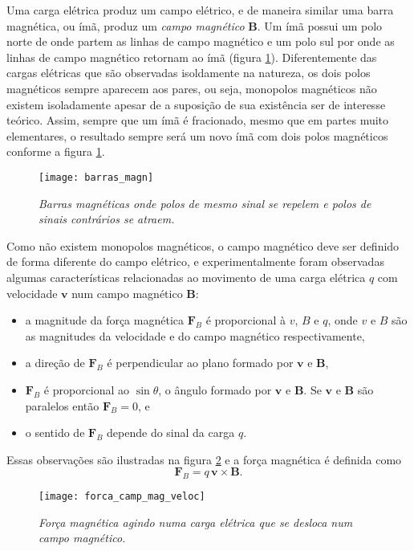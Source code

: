 Uma carga elétrica produz um campo elétrico, e de maneira similar uma barra magnética, ou ímã, produz um \textit{campo magnético} $\textbf{B}$. Um ímã possui um polo norte de onde partem as linhas de campo magnético e um polo sul por onde as linhas de campo magnético retornam ao ímã (figura \ref{fig.barras_mag}). Diferentemente das cargas elétricas que são observadas isoldamente na natureza, os dois polos magnéticos sempre aparecem aos pares, ou seja, monopolos magnéticos não existem isoladamente apesar de a suposição de sua existência ser de interesse teórico. Assim, sempre que um ímã é fracionado, mesmo que em partes muito elementares, o resultado sempre será um novo ímã com dois polos magnéticos conforme a figura \ref{fig.barras_mag}.
\begin{figure}[!htb]
\centering
\texttt{[image: barras\_magn]}
\caption{\textit{Barras magnéticas onde polos de mesmo sinal se repelem e polos de sinais contrários se atraem.}}
\label{fig.barras_mag}
\end{figure}
Como não existem monopolos magnéticos, o campo magnético deve ser definido de forma diferente do campo elétrico, e experimentalmente foram observadas algumas características relacionadas ao movimento de uma carga elétrica $q$ com velocidade $\textbf{v}$ num campo magnético $\textbf{B}$:
\begin{itemize}
\item a magnitude da força magnética $\textbf{F}_B$ é proporcional à $v$, $B$ e $q$, onde $v$ e $B$ são as magnitudes da velocidade e do campo magnético respectivamente,
\item a direção de $\textbf{F}_B$ é perpendicular ao plano formado por $\textbf{v}$ e $\textbf{B}$,
\item $\textbf{F}_B$ é proporcional ao $\sin\theta$, o ângulo formado por $\textbf{v}$ e $\textbf{B}$. Se $\textbf{v}$ e $\textbf{B}$ são paralelos então $\textbf{F}_B=0$, e
\item o sentido de $\textbf{F}_B$ depende do sinal da carga $q$.
\end{itemize}
Essas observações são ilustradas na figura \ref{fig.froca_mag_veloc} e a força magnética é definida como
\begin{equation*}
\textbf{F}_B=q\,\textbf{v}\times\textbf{B}.
\end{equation*}
\begin{figure}[!htb]
\centering
\texttt{[image: forca\_camp\_mag\_veloc]}
\caption{\textit{Força magnética agindo numa carga elétrica que se desloca num campo magnético.}}
\label{fig.froca_mag_veloc}
\end{figure}
